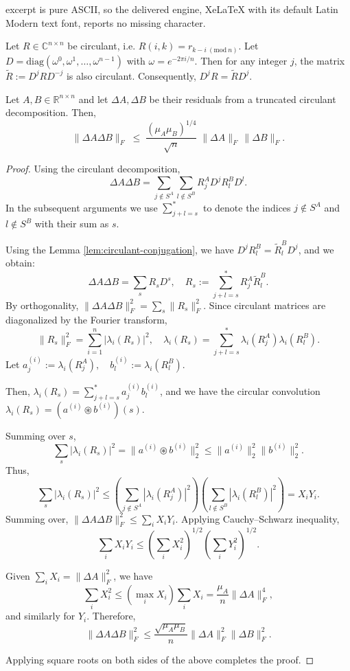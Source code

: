 \documentclass[10pt,a4paper]{amsart}
\begin{document}
excerpt is pure ASCII, so the delivered engine, XeLaTeX with its default Latin Modern text font, reports no missing character.
\begin{lemma}\label{lem:circulant-conjugation}

Let $R \in \mathbb{C}^{n \times n}$ be circulant, i.e. $R(i,k) = r_{k-i \ (\mathrm{mod}\ n)}.$ Let $D = \mathrm{diag}(\omega^0, \omega^1, \dots, \omega^{n-1})$ with $\omega = e^{-2\pi i / n}.$ Then for any integer $j$, the matrix $\widetilde{R} := D^j R D^{-j}$ is also circulant. Consequently, $D^j R = \widetilde{R} D^j.$
\end{lemma}

\begin{theorem}
\label{th:cd-deterministic}
Let $A, B \in \mathbb{R}^{n \times n}$ and let $\Delta A, \Delta B$ be their residuals from a truncated circulant decomposition. Then,
\[
\|\Delta A \Delta B\|_F
\;\le\;
\frac{(\mu_A \mu_B)^{1/4}}{\sqrt{n}}\;
\|\Delta A\|_F \, \|\Delta B\|_F.
\]
\end{theorem}

\begin{proof}
Using the circulant decomposition,
\[
\Delta A \Delta B
=
\sum_{j \notin S^A} \sum_{l \notin S^B}
R_j^A D^j R_l^B D^l.
\]
In the subsequent arguments we use $\sum_{j+l = s}^*$ to denote the indices $j \notin S^A$ and $l \notin S^B$ with their sum as $s$. 

Using the Lemma \ref{lem:circulant-conjugation}, we have $D^j R_l^B = \tilde{R}_l^B D^j$, and we obtain:
\[
\Delta A \Delta B
=
\sum_s R_s D^s,
\quad
R_s := \sum_{j+l=s}^* R_j^A \tilde{R}_l^B.
\]
By orthogonality, $\|\Delta A \Delta B\|_F^2 = \sum_s \|R_s\|_F^2.$ Since circulant matrices are diagonalized by the Fourier transform,
\[
\|R_s\|_F^2 = \sum_{i=1}^n |\lambda_i(R_s)|^2,
\quad
\lambda_i(R_s) = \sum_{j+l=s}^* \lambda_i(R_j^A)\lambda_i(R_l^B).
\]
Let $a_j^{(i)} := \lambda_i(R_j^A),
\quad b_l^{(i)} := \lambda_i(R_l^B).$

Then, $\lambda_i(R_s) = \sum_{j+l=s}^* a_j^{(i)} b_l^{(i)}$, and we have the circular convolution $\lambda_i(R_s) = (a^{(i)} \circledast b^{(i)})(s)$. 

Summing over $s$,
\[
\sum_s |\lambda_i(R_s)|^2
=
\|a^{(i)} \circledast b^{(i)}\|_2^2
\le
\|a^{(i)}\|_2^2 \|b^{(i)}\|_2^2.
\]
Thus,
\[
\sum_s |\lambda_i(R_s)|^2
\le
\left(\sum_{j \notin S^A} |\lambda_i(R_j^A)|^2\right)
\left(\sum_{l \notin S^B} |\lambda_i(R_l^B)|^2\right)
= X_i Y_i.
\]
Summing over, $\|\Delta A \Delta B\|_F^2
\le \sum_i X_i Y_i.$ Applying Cauchy--Schwarz inequality,
\[
\sum_i X_i Y_i
\le
\left(\sum_i X_i^2\right)^{1/2}
\left(\sum_i Y_i^2\right)^{1/2}.
\]

Given $\sum_i X_i = \|\Delta A\|_F^2$, we have
\[
\sum_i X_i^2 \le (\max_i X_i)\sum_i X_i
=
\frac{\mu_A}{n}\|\Delta A\|_F^4,
\]
and similarly for $Y_i$. Therefore,
\[
\|\Delta A \Delta B\|_F^2
\le
\frac{\sqrt{\mu_A \mu_B}}{n}
\|\Delta A\|_F^2 \|\Delta B\|_F^2.
\]

Applying square roots on both sides of the above completes the proof.
\end{proof}
\end{document}
